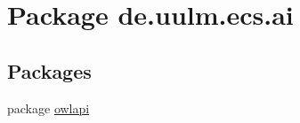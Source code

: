 \hypertarget{namespacede_1_1uulm_1_1ecs_1_1ai}{\section{Package de.\-uulm.\-ecs.\-ai}
\label{namespacede_1_1uulm_1_1ecs_1_1ai}
}
\subsection*{Packages}
\begin{DoxyCompactItemize}
\item 
package \hyperlink{namespacede_1_1uulm_1_1ecs_1_1ai_1_1owlapi}{owlapi}
\end{DoxyCompactItemize}
